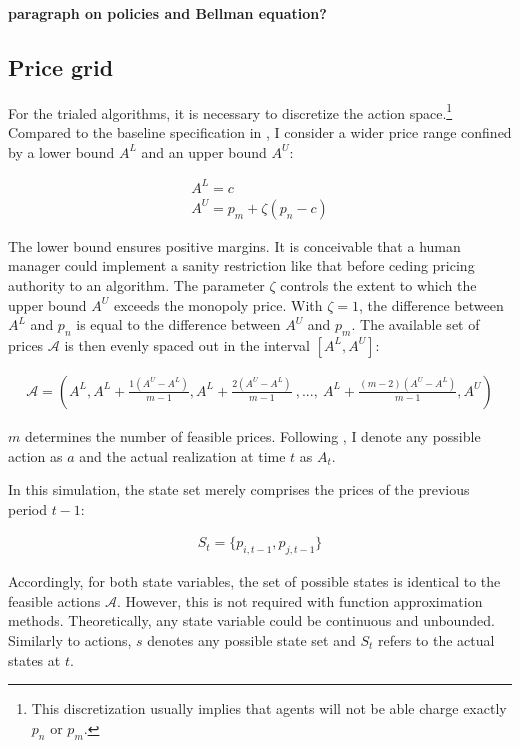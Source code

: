 \textbf{paragraph on policies and Bellman equation?}


\subsection{Price grid}

For the trialed algorithms, it is necessary to discretize the action space.\footnote{This discretization usually implies that agents will not be able charge exactly $p_n$ or $p_m$.} Compared to the baseline specification in \textcite{calvano_artificial_2019}, I consider a wider price range confined by a lower bound $A^L$ and an upper bound $A^U$:

\begin{gather}\label{price_grid_formula}
A^{L} = c \\
A^{U} = p_m + \zeta (p_n - c)
\end{gather}

The lower bound ensures positive margins. It is conceivable that a human manager could implement a sanity restriction like that before ceding pricing authority to an algorithm. The parameter $\zeta$ controls the extent to which the upper bound $A^U$ exceeds the monopoly price. With $\zeta = 1$, the difference between $A^{L}$ and $p_n$ is equal to the difference between $A^{U}$ and $p_m$. The available set of prices $\mathcal{A}$ is then evenly spaced out in the interval $[A^L, A^U]$:

\begin{gather}\label{available_prices}
\mathcal{A} = (A^L, A^L + \frac{1(A^U - A^L)}{m-1}, A^L + \frac{2(A^U - A^L)}{m-1}~ , ... , ~ A^L + \frac{(m-2)(A^U - A^L)}{m-1}, A^U)
\end{gather}

$m$ determines the number of feasible prices. Following \textcite{sutton_reinforcement_2018}, I denote any possible action as $a$ and the actual realization at time $t$ as $A_t$.

In this simulation, the state set merely comprises the prices of the previous period $t-1$:

\begin{gather}
S_t = \{ p_{i, t-1}, p_{j, t-1} \}
\end{gather}

Accordingly, for both state variables, the set of possible states is identical to the feasible actions $\mathcal{A}$. However, this is not required with function approximation methods. Theoretically, any state variable could be continuous and unbounded. Similarly to actions, $s$ denotes any possible state set and $S_t$ refers to the actual states at $t$.


